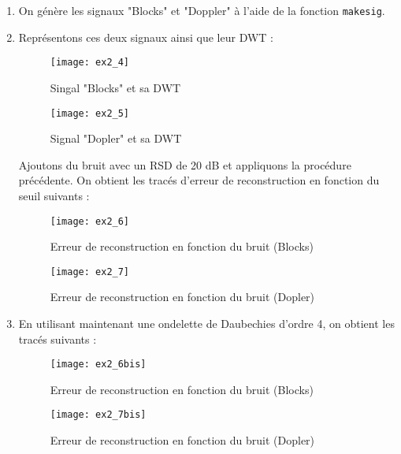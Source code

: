 \documentclass[12pt,a4paper,titlepage]{article}
\begin{document}
\begin{enumerate}
        \item{On génère les signaux "Blocks" et "Doppler" à l'aide de la
            fonction \texttt{makesig}.}

        \item{Représentons ces deux signaux ainsi que leur DWT :

                \begin{figure}[H]
                    \caption{Singal "Blocks" et sa DWT}
                    \texttt{[image: ex2\_4]}
                    \centering
                \end{figure}

                \begin{figure}[H]
                    \caption{Signal "Dopler" et sa DWT}
                    \texttt{[image: ex2\_5]}
                    \centering
                \end{figure}

                Ajoutons du bruit avec un RSD de 20 dB et appliquons la
                procédure précédente. On obtient les tracés d'erreur de
                reconstruction en fonction du seuil suivants :

                \begin{figure}[H]
                    \caption{Erreur de reconstruction en fonction du bruit (Blocks)}
                    \texttt{[image: ex2\_6]}
                    \centering
                \end{figure}

                \begin{figure}[H]
                    \caption{Erreur de reconstruction en fonction du bruit (Dopler)}
                    \texttt{[image: ex2\_7]}
                    \centering
                \end{figure}
            }

        \item{En utilisant maintenant une ondelette de Daubechies d'ordre 4,
                on obtient les tracés suivants :

                \begin{figure}[H]
                    \caption{Erreur de reconstruction en fonction du bruit (Blocks)}
                    \texttt{[image: ex2\_6bis]}
                    \centering
                \end{figure}

                \begin{figure}[H]
                    \caption{Erreur de reconstruction en fonction du bruit (Dopler)}
                    \texttt{[image: ex2\_7bis]}
                    \centering
                \end{figure}

            }

    \end{enumerate}
\end{document}
